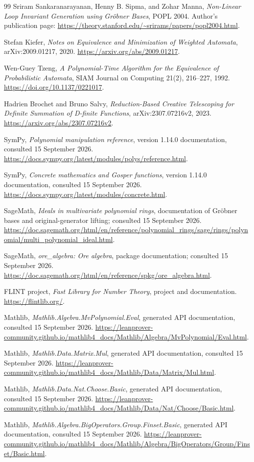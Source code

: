 \begin{thebibliography}{99}
Sriram Sankaranarayanan, Henny B. Sipma, and Zohar Manna,
\emph{Non-Linear Loop Invariant Generation using Gr\"obner Bases},
POPL 2004. Author's publication page:
\url{https://theory.stanford.edu/~srirams/papers/popl2004.html}.

Stefan Kiefer, \emph{Notes on Equivalence and Minimization of Weighted
Automata}, arXiv:2009.01217, 2020.
\url{https://arxiv.org/abs/2009.01217}.

Wen-Guey Tzeng, \emph{A Polynomial-Time Algorithm for the Equivalence of
Probabilistic Automata}, SIAM Journal on Computing 21(2), 216--227, 1992.
\url{https://doi.org/10.1137/0221017}.

Hadrien Brochet and Bruno Salvy, \emph{Reduction-Based Creative Telescoping for
Definite Summation of D-finite Functions}, arXiv:2307.07216v2, 2023.
\url{https://arxiv.org/abs/2307.07216v2}.

SymPy, \emph{Polynomial manipulation reference}, version 1.14.0 documentation,
consulted 15 September 2026.
\url{https://docs.sympy.org/latest/modules/polys/reference.html}.

SymPy, \emph{Concrete mathematics and Gosper functions}, version 1.14.0
documentation, consulted 15 September 2026.
\url{https://docs.sympy.org/latest/modules/concrete.html}.

SageMath, \emph{Ideals in multivariate polynomial rings}, documentation of
Gr\"obner bases and original-generator lifting; consulted 15 September 2026.
\url{https://doc.sagemath.org/html/en/reference/polynomial_rings/sage/rings/polynomial/multi_polynomial_ideal.html}.

SageMath, \emph{ore\_algebra: Ore algebra}, package documentation; consulted
15 September 2026.
\url{https://doc.sagemath.org/html/en/reference/spkg/ore_algebra.html}.

FLINT project, \emph{Fast Library for Number Theory}, project and documentation.
\url{https://flintlib.org/}.

Mathlib, \emph{Mathlib.Algebra.MvPolynomial.Eval}, generated API documentation,
consulted 15 September 2026.
\url{https://leanprover-community.github.io/mathlib4_docs/Mathlib/Algebra/MvPolynomial/Eval.html}.

Mathlib, \emph{Mathlib.Data.Matrix.Mul}, generated API documentation,
consulted 15 September 2026.
\url{https://leanprover-community.github.io/mathlib4_docs/Mathlib/Data/Matrix/Mul.html}.

Mathlib, \emph{Mathlib.Data.Nat.Choose.Basic}, generated API documentation,
consulted 15 September 2026.
\url{https://leanprover-community.github.io/mathlib4_docs/Mathlib/Data/Nat/Choose/Basic.html}.

Mathlib, \emph{Mathlib.Algebra.BigOperators.Group.Finset.Basic}, generated API
documentation, consulted 15 September 2026.
\url{https://leanprover-community.github.io/mathlib4_docs/Mathlib/Algebra/BigOperators/Group/Finset/Basic.html}.
\end{thebibliography}
